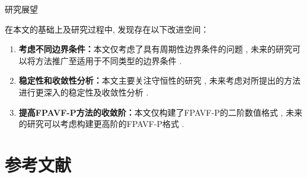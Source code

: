 \documentclass[aspectratio=169]{beamer}
\numberwithin{theorem}{section} %
\numberwithin{equation}{section}%
\numberwithin{figure}{section}%
\numberwithin{table}{section}%
\begin{document}


\begin{frame}{研究展望}

		在本文的基础上及研究过程中, 发现存在以下改进空间：

		\begin{enumerate}
			\item \textbf{\textcolor[rgb]{0.227,0.373,0.306}{考虑不同边界条件：}}本文仅考虑了具有周期性边界条件的问题 , 未来的研究可以将方法推广至适用于不同类型的边界条件 .
			\item \textbf{\textcolor[rgb]{0.227,0.373,0.306}{稳定性和收敛性分析：}}本文主要关注守恒性的研究 , 未来考虑对所提出的方法进行更深入的稳定性及收敛性分析 . 
			\item \textbf{\textcolor[rgb]{0.227,0.373,0.306}{提高FPAVF-P方法的收敛阶：}}本文仅构建了FPAVF-P的二阶数值格式 , 未来的研究可以考虑构建更高阶的FPAVF-P格式 . 
		\end{enumerate}

\end{frame}

\section{参考文献}
\end{document}
